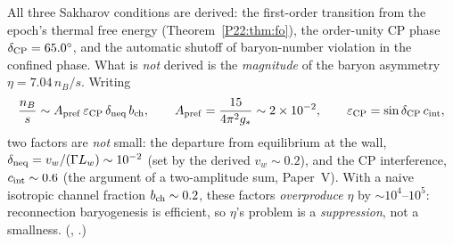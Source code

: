 All three Sakharov conditions are derived: the first-order transition
from the epoch's thermal free energy (Theorem~\ref{P22:thm:fo}), the
order-unity CP phase $\delta_{\rm CP}=65.0^\circ$, and the automatic
shutoff of baryon-number violation in the confined phase. What is
\emph{not} derived is the \emph{magnitude} of the baryon asymmetry
$\eta=7.04\,n_B/s$. Writing
\begin{equation}
  \frac{n_B}{s}\sim A_{\rm pref}\,\varepsilon_{\rm CP}\,\delta_{\rm neq}\,b_{\rm ch},\qquad
  A_{\rm pref}=\frac{15}{4\pi^2 g_*}\sim2\times10^{-2},\qquad
  \varepsilon_{\rm CP}=\sin\delta_{\rm CP}\,c_{\rm int},
  \label{P22:eq:eta}
\end{equation}
two factors are \emph{not} small: the departure from equilibrium at the
wall, $\delta_{\rm neq}=v_w/(\Gamma L_w)\sim10^{-2}$ (set by the derived
$v_w\sim0.2$), and the CP interference, $c_{\rm int}\sim0.6$ (the
argument of a two-amplitude sum, Paper~V). With a naive isotropic
channel fraction $b_{\rm ch}\sim0.2$, these factors \emph{overproduce}
$\eta$ by $\sim10^{4}$--$10^{5}$: reconnection baryogenesis is
efficient, so $\eta$'s problem is a \emph{suppression}, not a
smallness. (,
.)

